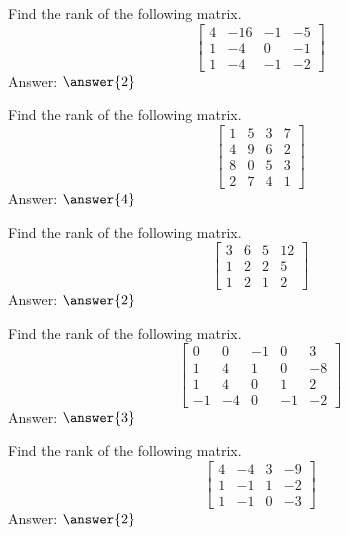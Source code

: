 \documentclass{ximera}
\begin{document}
\begin{problem}\label{prb:2.44} Find the rank of the following matrix.
\begin{equation*}
\left[
\begin{array}{rrrr}
4 & -16 & -1 & -5 \\
1 & -4 & 0 & -1 \\
1 & -4 & -1 & -2
\end{array}
\right]
\end{equation*}
Answer: $\answer{2}$
\end{problem}

\begin{problem}\label{prb:2.45a} Find the rank of the following matrix.
\begin{equation*}
\left[
\begin{array}{rrrr}
1 & 5 & 3 & 7 \\
4 & 9 & 6 & 2 \\
8 & 0 & 5 & 3 \\
2 & 7 & 4 & 1
\end{array}
\right]
\end{equation*}
Answer: $\answer{4}$
\end{problem}

\begin{problem}\label{prb:2.45} Find the rank of the following matrix.
\begin{equation*}
\left[
\begin{array}{rrrr}
3 & 6 & 5 & 12 \\
1 & 2 & 2 & 5 \\
1 & 2 & 1 & 2
\end{array}
\right]
\end{equation*}
Answer: $\answer{2}$
\end{problem}

\begin{problem}\label{prb:2.46} Find the rank of the following matrix.
\begin{equation*}
\left[
\begin{array}{rrrrr}
0 & 0 & -1 & 0 & 3 \\
1 & 4 & 1 & 0 & -8 \\
1 & 4 & 0 & 1 & 2 \\
-1 & -4 & 0 & -1 & -2
\end{array}
\right]
\end{equation*}
Answer: $\answer{3}$
\end{problem}

\begin{problem}\label{prb:2.47} Find the rank of the following matrix.
\begin{equation*}
\left[
\begin{array}{rrrr}
4 & -4 & 3 & -9 \\
1 & -1 & 1 & -2 \\
1 & -1 & 0 & -3
\end{array}
\right]
\end{equation*}
Answer: $\answer{2}$
\end{problem}
\end{document}

